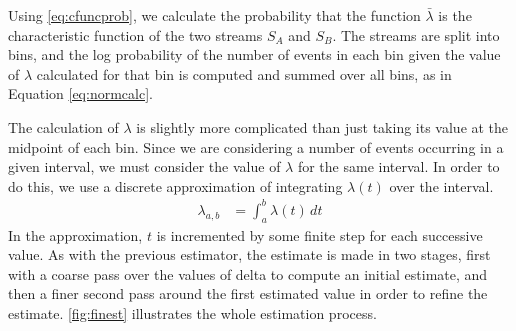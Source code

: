 \documentclass[11pt]{article}
\begin{document}
   Using \eqref{eq:cfuncprob}, we calculate the probability that the function $\bar{\lambda}$ is the
   characteristic function of the two streams $S_A$ and $S_B$. The streams are
   split into bins, and the log probability of the number of events in each bin
   given the value of $\lambda$ calculated for that bin is computed and summed
   over all bins, as in Equation \eqref{eq:normcalc}.

   The calculation of $\lambda$ is slightly more complicated than just taking
   its value at the midpoint of each bin. Since we are considering a number of
   events occurring in a given interval, we must consider the value of $\lambda$
   for the same interval. In order to do this, we use a discrete approximation
   of integrating $\lambda(t)$ over the interval.
   \begin{align}
   \lambda_{a,b}&=\int_a^b\lambda(t)\,dt
   \end{align}
   In the approximation, $t$ is incremented by some finite step for each
   successive value. As with the previous estimator, the estimate is made in two
   stages, first with a coarse pass over the values of delta to compute an
   initial estimate, and then a finer second pass around the first estimated
   value in order to refine the estimate.
   \ref{fig:finest} illustrates the whole estimation process.
\end{document}

